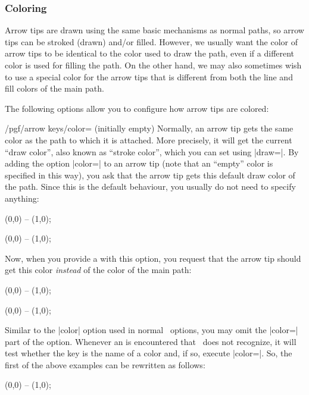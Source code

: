 \subsubsection{Coloring}

Arrow tips are drawn using the same basic mechanisms as normal paths, so arrow
tips can be stroked (drawn) and/or filled. However, we usually want the color
of arrow tips to be identical to the color used to draw the path, even if a
different color is used for filling the path. On the other hand, we may also
sometimes wish to use a special color for the arrow tips that is different from
both the line and fill colors of the main path.

The following options allow you to configure how arrow tips are colored:

\begin{key}{/pgf/arrow keys/color= (initially \normalfont empty)}
    Normally, an arrow tip gets the same color as the path to which it is
    attached. More precisely, it will get the current ``draw color'', also
    known as ``stroke color'', which you can set using |draw=|. By adding the option |color=| to an arrow tip (note that an
    ``empty'' color is specified in this way), you ask that the arrow tip gets
    this default draw color of the path. Since this is the default behaviour,
    you usually do not need to specify anything:
\begin{codeexample}[width=3cm]
 \draw [red, arrows = {-Stealth}] (0,0) -- (1,0);
\end{codeexample}
\begin{codeexample}[width=3cm]
 \draw [blue, arrows = {-Stealth}] (0,0) -- (1,0);
\end{codeexample}

    Now, when you provide a  with this option, you request that the
    arrow tip should get this color \emph{instead} of the color of the main
    path:
\begin{codeexample}[width=3cm]
 \draw [red, arrows = {-Stealth[color=blue]}] (0,0) -- (1,0);
\end{codeexample}
\begin{codeexample}[width=3cm]
 \draw [red, arrows = {-Stealth[color=black]}] (0,0) -- (1,0);
\end{codeexample}

    Similar to the |color| option used in normal \tikzname\ options, you may
    omit the |color=| part of the option. Whenever an  is
    encountered that \tikzname\ does not recognize, it will test whether the
    key is the name of a color and, if so, execute |color=|.
    So, the first of the above examples can be rewritten as follows:
\begin{codeexample}[width=3cm]
 \draw [red, arrows = {-Stealth[blue]}] (0,0) -- (1,0);
\end{codeexample}


\end{key}
